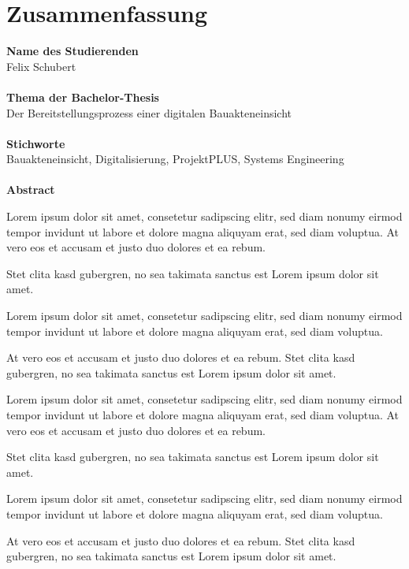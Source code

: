 \section*{Zusammenfassung}

\textbf{Name des Studierenden}\\
\noindent\hspace*{15mm}%
Felix Schubert
\\
\\
\textbf{Thema der Bachelor-Thesis}\\
\noindent\hspace*{15mm}%
Der Bereitstellungsprozess einer digitalen Bauakteneinsicht
\\
\\
\textbf{Stichworte}\\
\noindent\hspace*{15mm}%
Bauakteneinsicht, Digitalisierung, ProjektPLUS, Systems Engineering
\\
\\
\textbf{Abstract}
\par
\begingroup
\leftskip=15mm %
\vspace{-0.33cm}
\noindent %

Lorem ipsum dolor sit amet, consetetur sadipscing elitr, sed diam nonumy eirmod tempor invidunt ut labore et dolore magna aliquyam erat, sed diam voluptua. At vero eos et accusam et justo duo dolores et ea rebum. 

Stet clita kasd gubergren, no sea takimata sanctus est Lorem ipsum dolor sit amet. 

Lorem ipsum dolor sit amet, consetetur sadipscing elitr, sed diam nonumy eirmod tempor invidunt ut labore et dolore magna aliquyam erat, sed diam voluptua. 

At vero eos et accusam et justo duo dolores et ea rebum. Stet clita kasd gubergren, no sea takimata sanctus est Lorem ipsum dolor sit amet.

Lorem ipsum dolor sit amet, consetetur sadipscing elitr, sed diam nonumy eirmod tempor invidunt ut labore et dolore magna aliquyam erat, sed diam voluptua. At vero eos et accusam et justo duo dolores et ea rebum. 

Stet clita kasd gubergren, no sea takimata sanctus est Lorem ipsum dolor sit amet. 

Lorem ipsum dolor sit amet, consetetur sadipscing elitr, sed diam nonumy eirmod tempor invidunt ut labore et dolore magna aliquyam erat, sed diam voluptua. 

At vero eos et accusam et justo duo dolores et ea rebum. Stet clita kasd gubergren, no sea takimata sanctus est Lorem ipsum dolor sit amet.
\par
\endgroup